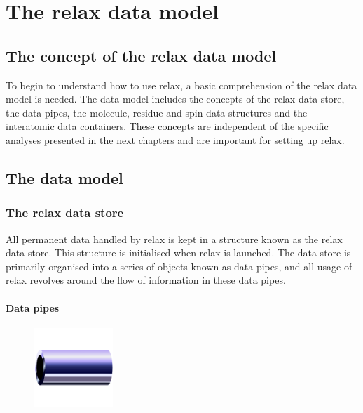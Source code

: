 
\chapter{The relax data model} \label{ch: data model}



\section{The concept of the relax data model}

To begin to understand how to use relax, a basic comprehension of the relax data model is needed.
The data model includes the concepts of the relax data store, the data pipes, the molecule, residue and spin data structures and the interatomic data containers.
These concepts are independent of the specific analyses presented in the next chapters and are important for setting up relax.




\section{The data model}



\subsection{The relax data store}

All permanent data handled by relax is kept in a structure known as the relax data store.
This structure is initialised when relax is launched.
The data store is primarily organised into a series of objects known as data pipes, and all usage of relax revolves around the flow of information in these data pipes.


\subsubsection{Data pipes}

\begin{figure}[h]
  \includegraphics[width=3cm, bb=0 0 1701 1701]{graphics/misc/pipe_600x600}
\end{figure}

